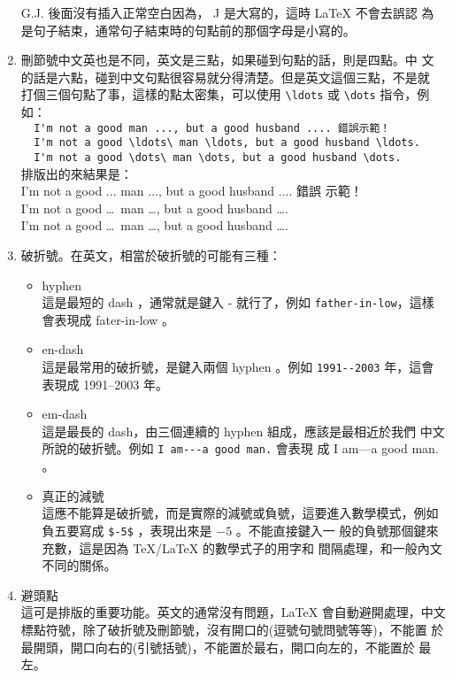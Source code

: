 \documentclass[12pt, a4paper]{report}
\begin{document}
\begin{enumerate}
          G.J. 後面沒有插入正常空白因為， J 是大寫的，這時 LaTeX 不會去誤認
            為是句子結束，通常句子結束時的句點前的那個字母是小寫的。
        \item 刪節號中文英也是不同，英文是三點，如果碰到句點的話，則是四點。中
          文的話是六點，碰到中文句點很容易就分得清楚。但是英文這個三點，不是就
          打個三個句點了事，這樣的點太密集，可以使用 \verb+\ldots+ 或 
          \verb+\dots+ 指令，例如：\\
            \verb+  I'm not a good man ..., but a good husband .... 錯誤示範！+\\
            \verb+  I'm not a good \ldots\ man \ldots, but a good husband \ldots.+\\
            \verb+  I'm not a good \dots\ man \dots, but a good husband \dots.+\\
          排版出的來結果是：\\
            I'm not a good ... man ..., but a good husband .... 錯誤
              示範！\\
            I'm not a good \ldots\ man \ldots, but a good husband 
              \ldots.\\
            I'm not a good \dots\ man \dots, but a good husband 
              \dots.
        \item 破折號。在英文，相當於破折號的可能有三種：
          \begin{itemize}
            \item hyphen \\
              這是最短的 dash ，通常就是鍵入 - 就行了，例如
                \verb+father-in-low+，這樣會表現成 fater-in-low 。
            \item en-dash \\
              這是最常用的破折號，是鍵入兩個 hyphen 。例如 
                \verb+1991--2003+ 年，這會表現成 1991--2003 年。
            \item em-dash \\
              這是最長的 dash，由三個連續的 hyphen 組成，應該是最相近於我們
                中文所說的破折號。例如 \verb+I am---a good man.+ 會表現
                成 I am---a good man. 。
            \item 真正的減號 \\
              這應不能算是破折號，而是實際的減號或負號，這要進入數學模式，例如
                負五要寫成 \verb+$-5$+ ，表現出來是 $ -5$ 。不能直接鍵入一
                般的負號那個鍵來充數，這是因為 TeX/LaTeX 的數學式子的用字和
                間隔處理，和一般內文不同的關係。
          \end{itemize}
        \item 避頭點 \\
          這可是排版的重要功能。英文的通常沒有問題，LaTeX 會自動避開處理，中文
            標點符號，除了破折號及刪節號，沒有開口的(逗號句號問號等等)，不能置
            於最開頭，開口向右的(引號括號)，不能置於最右，開口向左的，不能置於
            最左。
      \end{enumerate}
\end{document}
